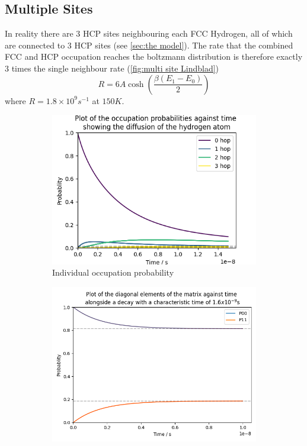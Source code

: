 \subsection{Multiple Sites}
In reality there
are 3 HCP sites neighbouring
each FCC Hydrogen, all of which
are connected to \(3\) HCP sites
(see \cref{sec:the model}).
The rate that the
combined FCC and HCP
occupation reaches the
boltzmann distribution
is therefore exactly \(3\)
times the single neighbour rate
(\cref{fig:multi site Lindblad})
\begin{equation}
    R = 6A\cosh{(\frac{\beta (E_1 - E_0)}{2})}
\end{equation}
where \(R=1.8\times{}10^{9}s^{-1}\) at
\(150K\).
\begin{figure}[htbp]
    \centering
    \begin{subfigure}{0.45\linewidth}
        \centering
        \includegraphics[width =0.9 \linewidth]{Figures/Redfield/Plot of Lindblad solution many sites.png}
        \caption{Individual occupation probability
        }\label{sub@fig:multi site Lindblad}
    \end{subfigure}
    \hfill
    \begin{subfigure}{0.45\linewidth}
        \centering
        \includegraphics[width = 0.9\linewidth]{Figures/Redfield/Plot of redfield solution long time.png}

\end{subfigure}
\end{figure}
